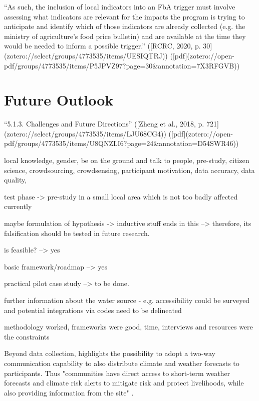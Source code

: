 “As such, the inclusion of local indicators into an FbA trigger must involve assessing what indicators are relevant for the impacts the program is trying to anticipate and identify which of those indicators are already collected (e.g. the ministry of agriculture's food price bulletin) and are available at the time they would be needed to inform a possible trigger.” ([RCRC, 2020, p. 30](zotero://select/groups/4773535/items/UESIQTRJ)) ([pdf](zotero://open-pdf/groups/4773535/items/P5JPVZ97?page=30&annotation=7X3RFGVB))


\section{Future Outlook}

“5.1.3. Challenges and Future Directions” ([Zheng et al., 2018, p. 721](zotero://select/groups/4773535/items/LJU68CG4)) ([pdf](zotero://open-pdf/groups/4773535/items/U8QNZLI6?page=24&annotation=D54SWR46))



local knowledge, gender, be on the ground and talk to people, pre-study, citizen science, crowdsourcing, crowdsensing, participant motivation, data accuracy, data quality,

test phase -> pre-study in a small local area which is not too badly affected currently 

maybe formulation of hypothesis -> inductive stuff ends in this --> therefore, its falsification should be tested in future research.


is feasible? --> yes

basic framework/roadmap --> yes

practical pilot case study --> to be done.


further information about the water source - e.g. accessibility could be surveyed and potential integrations via codes need to be delineated


methodology worked, frameworks were good, time, interviews and resources were the constraints



Beyond data collection, \autocite{gualazziniEWEAEarlyWarning2021} highlights the possibility to adopt a two-way communication capability to also distribute climate and weather forecasts to participants. Thus "communities have direct access to short-term weather forecasts and climate risk alerts to mitigate risk and protect livelihoods, while also providing information from the site" \autocite[20]{gualazziniEWEAEarlyWarning2021}. %


